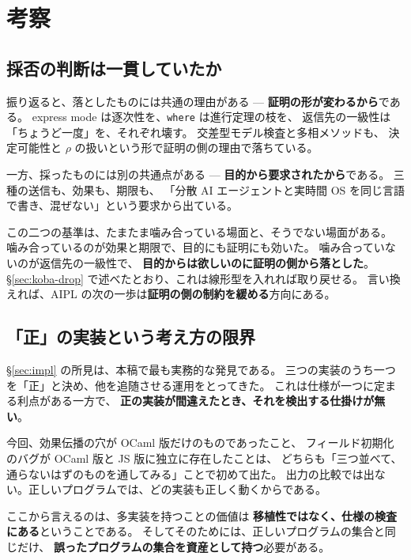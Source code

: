 \documentclass[11pt,a4paper]{ltjsarticle}
\theoremstyle{definition}
\theoremstyle{remark}
\begin{document}
\section{考察}
\label{sec:discuss}

\subsection{採否の判断は一貫していたか}

振り返ると、落としたものには共通の理由がある ---
\textbf{証明の形が変わるから}である。
express mode は逐次性を、\texttt{where} は進行定理の枝を、
返信先の一級性は「ちょうど一度」を、それぞれ壊す。
交差型モデル検査と多相メソッドも、
決定可能性と $\rho$ の扱いという形で証明の側の理由で落ちている。

一方、採ったものには別の共通点がある ---
\textbf{目的から要求されたから}である。
三種の送信も、効果も、期限も、
「分散 AI エージェントと実時間 OS を同じ言語で書き、混ぜない」という要求から出ている。

この二つの基準は、たまたま噛み合っている場面と、そうでない場面がある。
噛み合っているのが効果と期限で、目的にも証明にも効いた。
噛み合っていないのが返信先の一級性で、
\textbf{目的からは欲しいのに証明の側から落とした}。
\S\ref{sec:koba-drop} で述べたとおり、これは線形型を入れれば取り戻せる。
言い換えれば、AIPL の次の一歩は\textbf{証明の側の制約を緩める}方向にある。

\subsection{「正」の実装という考え方の限界}

\S\ref{sec:impl} の所見は、本稿で最も実務的な発見である。
三つの実装のうち一つを「正」と決め、他を追随させる運用をとってきた。
これは仕様が一つに定まる利点がある一方で、
\textbf{正の実装が間違えたとき、それを検出する仕掛けが無い}。

今回、効果伝播の穴が OCaml 版だけのものであったこと、
フィールド初期化のバグが OCaml 版と JS 版に独立に存在したことは、
どちらも「三つ並べて、通らないはずのものを通してみる」ことで初めて出た。
出力の比較では出ない。正しいプログラムでは、どの実装も正しく動くからである。

ここから言えるのは、多実装を持つことの価値は
\textbf{移植性ではなく、仕様の検査にある}ということである。
そしてそのためには、正しいプログラムの集合と同じだけ、
\textbf{誤ったプログラムの集合を資産として持つ}必要がある。
\end{document}
